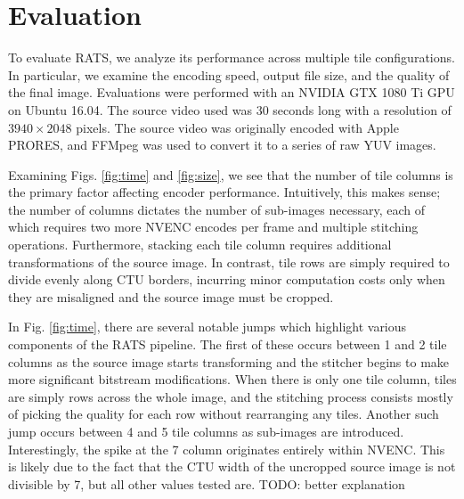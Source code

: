 

\section{Evaluation} \label{eval}
To evaluate RATS, we analyze its performance across multiple tile configurations. In particular, we examine the encoding speed, output file size, and the quality of the final image. Evaluations were performed with an NVIDIA GTX 1080 Ti GPU on Ubuntu 16.04. The source video used was 30 seconds long with a resolution of $3940\times2048$ pixels. The source video was originally encoded with Apple PRORES, and FFMpeg was used to convert it to a series of raw YUV images.

Examining Figs. \ref{fig:time} and \ref{fig:size}, we see that the number of tile columns is the primary factor affecting encoder performance. Intuitively, this makes sense; the number of columns dictates the number of sub-images necessary, each of which requires two more NVENC encodes per frame and multiple stitching operations. Furthermore, stacking each tile column requires additional transformations of the source image. In contrast, tile rows are simply required to divide evenly along CTU borders, incurring minor computation costs only when they are misaligned and the source image must be cropped.

In Fig. \ref{fig:time}, there are several notable jumps which highlight various components of the RATS pipeline. The first of these occurs between 1 and 2 tile columns as the source image starts transforming and the stitcher begins to make more significant bitstream modifications. When there is only one tile column, tiles are simply rows across the whole image, and the stitching process consists mostly of picking the quality for each row without rearranging any tiles. Another such jump occurs between 4 and 5 tile columns as sub-images are introduced. Interestingly, the spike at the 7 column originates entirely within NVENC. This is likely due to the fact that the CTU width of the uncropped source image is not divisible by 7, but all other values tested are. TODO: better explanation

